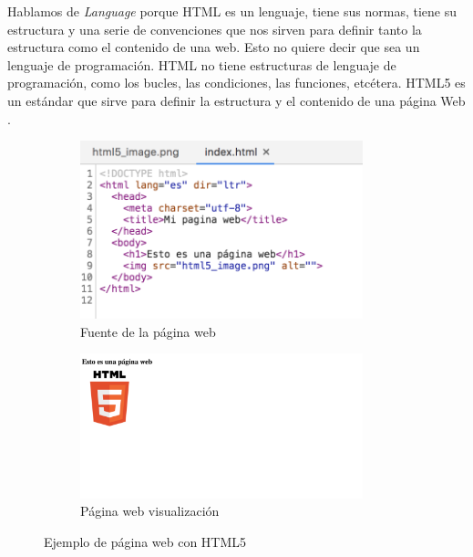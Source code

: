 Hablamos de \textit{Language} porque HTML es un lenguaje, tiene sus normas, tiene su estructura y una serie de convenciones que nos sirven para definir tanto la estructura como el contenido de una web. Esto no quiere decir que sea un lenguaje de programación. HTML no tiene estructuras de lenguaje de programación, como los bucles, las condiciones, las funciones, etcétera. HTML5 es un estándar que sirve para definir la estructura y el contenido de una página Web \cite{html2}. 

\begin{figure}[H]
    \begin{subfigure}[b]{0.5\textwidth}
  \centering
    \includegraphics[width=0.9\textwidth, height=0.5\textwidth]{chapters/images/simplehtmlpage.png}
    \caption{Fuente de la página web}
    \label{fig:f2}
  \end{subfigure}
  \begin{subfigure}[b]{0.5\textwidth}
  \centering
    \includegraphics[width=0.9\textwidth, height=0.5\textwidth]{chapters/images/simplehtml.png}
    \caption{Página web visualización}
    \label{fig:f1}
  \end{subfigure}
  \hfill
  
  \caption{Ejemplo de página web con HTML5}
\end{figure}

